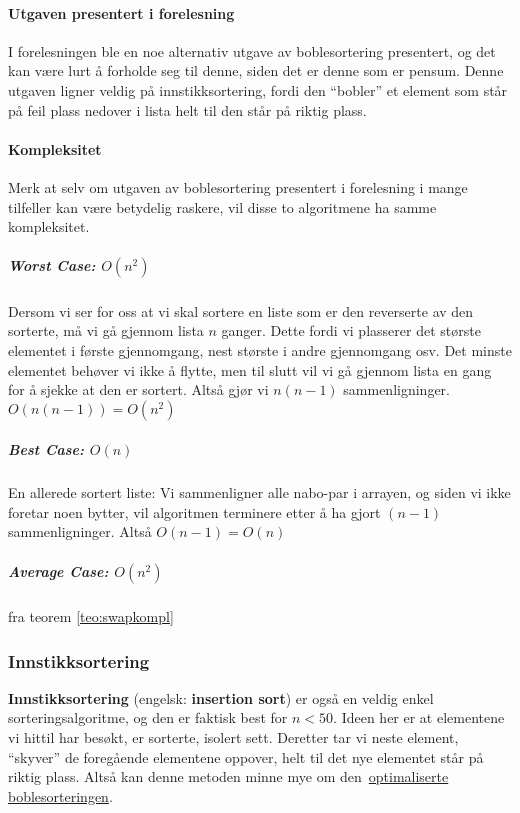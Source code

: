 
\paragraph*{Utgaven presentert i forelesning}\label{sec:bubbleoptimal}
I forelesningen ble en noe alternativ utgave av boblesortering presentert, og det kan være lurt å forholde seg til denne, siden det er denne som er pensum.
Denne utgaven ligner veldig på innstikksortering, fordi den ``bobler'' et element som står på feil plass nedover i lista helt til den står på riktig plass.


\paragraph{Kompleksitet}
Merk at selv om utgaven av boblesortering presentert i forelesning i mange tilfeller kan være
betydelig raskere, vil disse to algoritmene ha samme kompleksitet.

\subparagraph{Worst Case: $O(n^2)$} Dersom vi ser for oss at vi skal sortere en
liste som er den reverserte av den sorterte, må vi gå gjennom lista $n$ ganger.
Dette fordi vi plasserer det største elementet i første gjennomgang, nest
største i andre gjennomgang osv. Det minste elementet behøver vi ikke å flytte,
men til slutt vil vi gå gjennom lista en gang for å sjekke at den er sortert.
Altså gjør vi $n(n-1)$ sammenligninger. $O(n(n-1)) = O(n^2 )$

\subparagraph{Best Case: $O(n)$} En allerede sortert liste: Vi sammenligner alle nabo-par i arrayen, og
siden vi ikke foretar noen bytter, vil algoritmen terminere etter å ha gjort
$(n-1)$ sammenligninger. Altså $O(n-1) = O(n)$

\subparagraph{Average Case: $O(n^2)$} fra teorem \ref{teo:swapkompl}


\subsubsection{Innstikksortering}\label{insertsort}
\textbf{Innstikksortering} (engelsk: \textbf{insertion sort}) er også en veldig enkel sorteringsalgoritme, og den er faktisk best for $n<50$.
Ideen her er at elementene vi hittil har besøkt, er sorterte, isolert sett.
Deretter tar vi neste element, ``skyver'' de foregående elementene oppover,
helt til det nye elementet står på riktig plass.
Altså kan denne metoden minne mye om den~\hyperref[sec:bubbleoptimal]{optimaliserte boblesorteringen}. 

